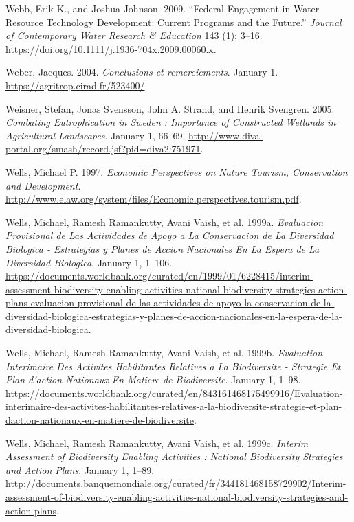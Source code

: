 \begin{CSLReferences}{1}{1}
Webb, Erik K., and Joshua Johnson. 2009. {``Federal Engagement in Water
Resource Technology Development: Current Programs and the Future.''}
\emph{Journal of Contemporary Water Research \& Education} 143 (1):
3--16. \url{https://doi.org/10.1111/j.1936-704x.2009.00060.x}.

Weber, Jacques. 2004. \emph{Conclusions et remerciements}. January 1.
\url{https://agritrop.cirad.fr/523400/}.

Weisner, Stefan, Jonas Svensson, John A. Strand, and Henrik Svengren.
2005. \emph{Combating Eutrophication in Sweden : Importance of
Constructed Wetlands in Agricultural Landscapes}. January 1, 66--69.
\url{http://www.diva-portal.org/smash/record.jsf?pid=diva2:751971}.

Wells, Michael P. 1997. \emph{Economic Perspectives on Nature Tourism,
Conservation and Development}.
\url{http://www.elaw.org/system/files/Economic.perspectives.tourism.pdf}.

Wells, Michael, Ramesh Ramankutty, Avani Vaish, et al. 1999a.
\emph{Evaluacion Provisional de Las Actividades de Apoyo a La
Conservacion de La Diversidad Biologica - Estrategias y Planes de Accion
Nacionales En La Espera de La Diversidad Biologica}. January 1, 1--106.
\url{https://documents.worldbank.org/curated/en/1999/01/6228415/interim-assessment-biodiversity-enabling-activities-national-biodiversity-strategies-action-plans-evaluacion-provisional-de-las-actividades-de-apoyo-la-conservacion-de-la-diversidad-biologica-estrategias-y-planes-de-accion-nacionales-en-la-espera-de-la-diversidad-biologica}.

Wells, Michael, Ramesh Ramankutty, Avani Vaish, et al. 1999b.
\emph{Evaluation Interimaire Des Activites Habilitantes Relatives a La
Biodiversite - Strategie Et Plan d'action Nationaux En Matiere de
Biodiversite}. January 1, 1--98.
\url{https://documents.worldbank.org/curated/en/843161468175499916/Evaluation-interimaire-des-activites-habilitantes-relatives-a-la-biodiversite-strategie-et-plan-daction-nationaux-en-matiere-de-biodiversite}.

Wells, Michael, Ramesh Ramankutty, Avani Vaish, et al. 1999c.
\emph{Interim Assessment of Biodiversity Enabling Activities : National
Biodiversity Strategies and Action Plans}. January 1, 1--89.
\url{http://documents.banquemondiale.org/curated/fr/344181468158729902/Interim-assessment-of-biodiversity-enabling-activities-national-biodiversity-strategies-and-action-plans}.


\end{CSLReferences}
